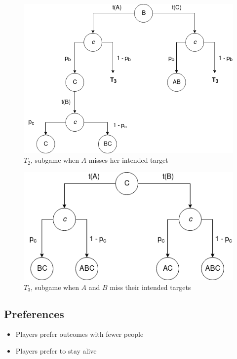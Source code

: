 \documentclass[letterpaper]{article}
\begin{document}
\begin{figure}[!ht]
 \centerline{\includegraphics[scale=0.5]{images/T2}}
 \caption{$T_2$, subgame when $A$ misses her intended target}
 \label{fig:t2}
\end{figure}

\begin{figure}[!ht]
 \centerline{\includegraphics[scale=0.5]{images/T3}}
 \caption{$T_3$, subgame when $A$ and $B$ miss their intended targets}
 \label{fig:t3}
\end{figure}

\subsection{Preferences}
\begin{itemize}
    \item Players prefer outcomes with fewer people
    \item Players prefer to stay alive
\end{itemize}
\end{document}
